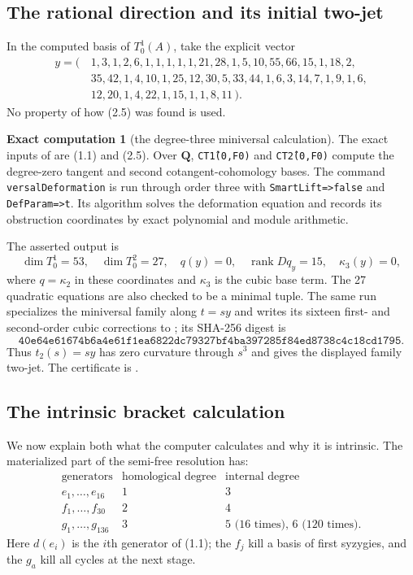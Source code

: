 \documentclass[11pt]{article}
\theoremstyle{definition}
\newtheorem{computation}[theorem]{Exact computation}
\theoremstyle{remark}
\newcommand{\QQ}{\mathbf Q}
\newcommand{\rank}{\operatorname{rank}}
\begin{document}
\subsection{The rational direction and its initial two-jet}

In the computed basis of $T^1_0(A)$, take the explicit vector
\[
\begin{split}
y=(\,&1,3,1,2,6,1,1,1,1,1,21,28,1,5,10,55,66,15,1,18,2,\\
&35,42,1,4,10,1,25,12,30,5,33,44,1,6,3,14,7,1,9,1,6,\\
&12,20,1,4,22,1,15,1,1,8,11\,).
\end{split}                                                     \tag{2.5}
\]
No property of how (2.5) was found is used.

\begin{computation}[the degree-three miniversal calculation]
\label{comp:formaldata}
The exact inputs of  are (1.1) and
(2.5).  Over $\QQ$, \texttt{CT\^1(0,F0)} and \texttt{CT\^2(0,F0)} compute
the degree-zero tangent and second cotangent-cohomology bases.  The command
\texttt{versalDeformation} is run through order three with
\texttt{SmartLift=>false} and \texttt{DefParam=>t}.  Its algorithm solves the
deformation equation and records its obstruction coordinates by exact
polynomial and module arithmetic.

The asserted output is
\[
 \dim T^1_0=53,\quad \dim T^2_0=27,\quad q(y)=0,\quad
 \rank Dq_y=15,\quad \kappa_3(y)=0,                            \tag{2.6}
\]
where $q=\kappa_2$ in these coordinates and $\kappa_3$ is the cubic base
term.  The 27 quadratic equations are also checked to be a minimal tuple.
The same run specializes the miniversal family along $t=sy$ and writes its
sixteen first- and second-order cubic corrections to
; its SHA-256 digest is
\[
\texttt{40e64e61674b6a4e61f1ea6822dc79327bf4ba397285f84ed8738c4c18cd1795}.
                                                                    \tag{2.7}
\]
Thus $t_2(s)=sy$ has zero curvature through $s^3$ and gives the displayed
family two-jet.  The certificate is
.
\end{computation}

\subsection{The intrinsic bracket calculation}

We now explain both what the computer calculates and why it is intrinsic.
The materialized part of the semi-free resolution has:
\[
\begin{array}{c|c|c}
\text{generators}&\text{homological degree}&\text{internal degree}\\ \hline
e_1,\ldots,e_{16}&1&3\\
f_1,\ldots,f_{30}&2&4\\
g_1,\ldots,g_{136}&3&5\text{ (16 times), }6\text{ (120 times).}
\end{array}                                                       \tag{2.8}
\]
Here $d(e_i)$ is the $i$th generator of (1.1); the $f_j$ kill a basis of
first syzygies, and the $g_a$ kill all cycles at the next stage.
\end{document}
